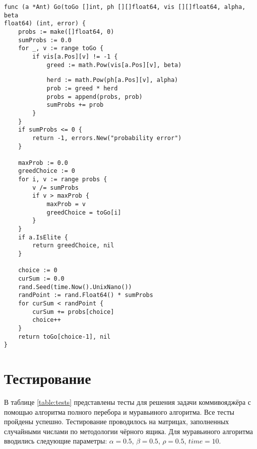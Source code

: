 \begin{code}
\caption{Листинг функции реализации поиска муравьём следующей вершины (начало)}
\label{code:go1}
\begin{verbatim}
func (a *Ant) Go(toGo []int, ph [][]float64, vis [][]float64, alpha, beta 
float64) (int, error) {
	probs := make([]float64, 0)
	sumProbs := 0.0
	for _, v := range toGo {
		if vis[a.Pos][v] != -1 {
			greed := math.Pow(vis[a.Pos][v], beta)
\end{verbatim}
\end{code}

\begin{code}
\caption{Листинг функции реализации поиска муравьём следующей вершины (продолжение листинга \ref{}code:go1)}
\label{code:go2}
\begin{verbatim}
			herd := math.Pow(ph[a.Pos][v], alpha)
			prob := greed * herd
			probs = append(probs, prob)
			sumProbs += prob
		}
	}
	if sumProbs <= 0 {
		return -1, errors.New("probability error")
	}
	
	maxProb := 0.0
	greedChoice := 0
	for i, v := range probs {
		v /= sumProbs
		if v > maxProb {
			maxProb = v
			greedChoice = toGo[i]
		}
	}
	if a.IsElite {
		return greedChoice, nil
	}
	
	choice := 0
	curSum := 0.0
	rand.Seed(time.Now().UnixNano())
	randPoint := rand.Float64() * sumProbs
	for curSum < randPoint {
		curSum += probs[choice]
		choice++
	}
	return toGo[choice-1], nil
}
\end{verbatim}
\end{code}

\newpage

\section{Тестирование}
В таблице \ref{table:tests} представлены тесты для решения задачи коммивояджёра с помощью алгоритма полного перебора и муравьиного алгоритма. Все тесты пройдены успешно. Тестирование проводилось на матрицах, заполненных случайными числами по методологии чёрного ящика. Для муравьиного алгоритма вводились следующие параметры: $\alpha = 0.5$, $\beta = 0.5$, $\rho = 0.5$, $time = 10$.

